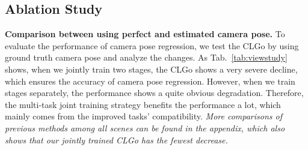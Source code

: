\documentclass[letterpaper]{article} \usepackage{aaai22}  \usepackage{times}  \usepackage{helvet}  \usepackage{courier}  \usepackage[hyphens]{url}  \usepackage{graphicx} \urlstyle{rm} \def\UrlFont{\rm}  \usepackage{natbib}  \usepackage{caption}
\begin{document}
\subsection{Ablation Study}
\begin{table}[t]
\begin{center}
\caption{Comparison between using perfect and estimated camera poses on SVV~(\%). The lower the decreased value (dc), the better the performance.}
\label{tab:viewstudy}
\end{center}
\vspace{-0.5em}
\end{table}
\noindent \textbf{Comparison between using perfect and estimated camera pose.}
To evaluate the performance of camera pose regression, we test the CLGo by using ground truth camera pose and analyze the changes.   
As Tab.~\ref{tab:viewstudy} shows, when we jointly train two stages, the CLGo shows a very severe decline, which ensures the accuracy of camera pose regression.
However, when we train stages separately, the performance shows a quite obvious degradation.
Therefore, the multi-task joint training strategy benefits the performance a lot, which mainly comes from the improved tasks' compatibility. \textit{More comparisons of previous methods among all scenes can be found in the appendix, which also shows that our jointly trained CLGo has the fewest decrease.}
\end{document}
